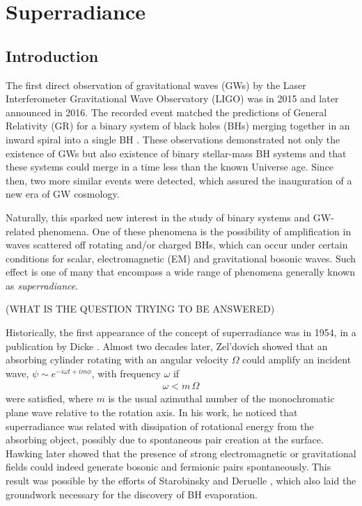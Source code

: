 
\chapter{Superradiance} %
\label{Chapter1}


\section{Introduction}

The first direct observation of gravitational waves (GWs) by the Laser Interferometer Gravitational Wave Observatory (LIGO) was in 2015 and later announced in 2016.
The recorded event matched the predictions of General Relativity (GR) for a binary system of black holes (BHs) merging together in an inward spiral into a single BH \cite{Abbott2016}.
These observations demonstrated not only the existence of GWs but also existence of binary stellar-mass BH systems and that these systems could merge in a time less than the known Universe age.
Since then, two more similar events were detected, which assured the inauguration of a new era of GW cosmology. 

Naturally, this sparked new interest in the study of binary systems and GW-related phenomena.
One of these phenomena is the possibility of amplification in waves scattered off rotating and/or charged BHs, which can occur under certain conditions for scalar, electromagnetic (EM) and gravitational bosonic waves.
Such effect is one of many that encompass a wide range of phenomena generally known as \emph{superradiance}.

(WHAT IS THE QUESTION TRYING TO BE ANSWERED)

Historically, the first appearance of the concept of superradiance was in 1954, in a publication by Dicke \cite{Dicke1954}.
Almost two decades later, Zel'dovich \cite{Zeldovich1971,Zeldovich1972} showed that an absorbing cylinder rotating with an angular velocity $\Omega$ could amplify an incident wave, $\psi \sim e^{-i \omega t + i m \phi}$, with frequency $\omega$ if
\begin{align}
    \omega < m\, \Omega
    \label{eq1:superradiance}
\end{align}
were satisfied, where $m$ is the usual azimuthal number of the monochromatic plane wave relative to the rotation axis.
In his work, he noticed that superradiance was related with dissipation of rotational energy from the absorbing object, possibly due to spontaneous pair creation at the surface. 
Hawking later showed that the presence of strong electromagnetic or gravitational fields could indeed generate bosonic and fermionic pairs spontaneously.
This result was possible by the efforts of Starobinsky and Deruelle \cite{Starobinsky1973a,Starobinsky1973b,Deruelle1974,Deruelle1975}, which also laid the groundwork necessary for the discovery of BH evaporation.

